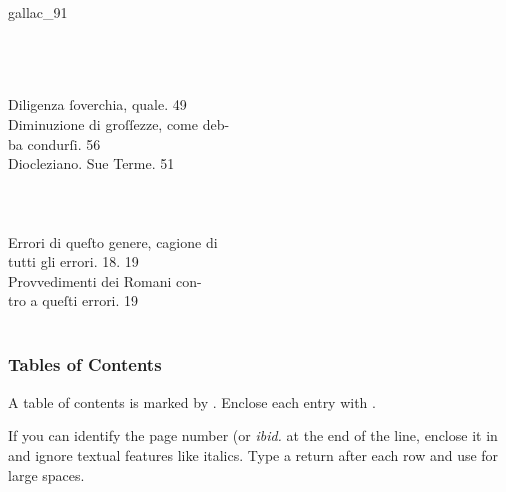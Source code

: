 
\begin{sampleImage}[ 2]{gallac_91}

\begin{typeLatin}
 \\
 \\
\someText \\
Diligenza ſoverchia, quale.  49 \\
Diminuzione di groſſezze, come deb- \\
 ba condurſi.  56 \\
Diocleziano. Sue Terme.  51  \\
\someText \\
 \\
\someText \\
Errori di queſto genere, cagione di \\
 tutti gli errori.  18. 19 \\
 Provvedimenti dei Romani con- \\
 tro a queſti errori.  19 \\
\someText \\
\end{typeLatin}
\end{sampleImage}


\subsubsection{Tables of Contents}
\label{section tables of contents}

\begin{mainrule}
  A table of contents is marked by . Enclose each entry with .

  If you can identify the page number (or \emph{ibid.} at the end of the line, enclose it in  and ignore textual features like italics. Type a return after each row and use  for large spaces.
\end{mainrule}

